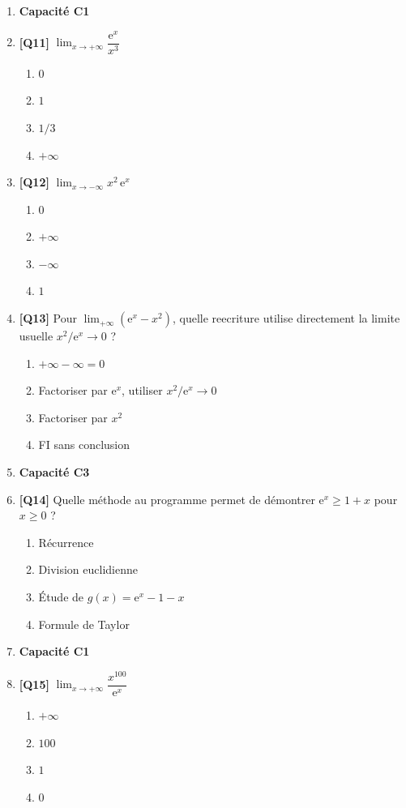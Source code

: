 \begin{enumerate}
\item[] \textbf{Capacité C1}

\item \textbf{[Q11]} $\lim_{x \to +\infty} \dfrac{\mathrm{e}^x}{x^3}$
  \begin{enumerate}[label=\Alph*.]
    \item $0$
    \item $1$
    \item $1/3$
    \item $+\infty$
  \end{enumerate}

\item \textbf{[Q12]} $\lim_{x \to -\infty} x^2\,\mathrm{e}^x$
  \begin{enumerate}[label=\Alph*.]
    \item $0$
    \item $+\infty$
    \item $-\infty$
    \item $1$
  \end{enumerate}

\item \textbf{[Q13]} Pour $\lim_{+\infty}(\mathrm{e}^x - x^2)$, quelle reecriture utilise directement la limite usuelle $x^2/\mathrm{e}^x \to 0$ ?
  \begin{enumerate}[label=\Alph*.]
    \item $+\infty - \infty = 0$
    \item Factoriser par $\mathrm{e}^x$, utiliser $x^2/\mathrm{e}^x \to 0$
    \item Factoriser par $x^2$
    \item FI sans conclusion
  \end{enumerate}

\item[] \textbf{Capacité C3}

\item \textbf{[Q14]} Quelle méthode au programme permet de démontrer $\mathrm{e}^x \geq 1 + x$ pour $x \geq 0$ ?
  \begin{enumerate}[label=\Alph*.]
    \item Récurrence
    \item Division euclidienne
    \item Étude de $g(x) = \mathrm{e}^x - 1 - x$
    \item Formule de Taylor
  \end{enumerate}

\item[] \textbf{Capacité C1}

\item \textbf{[Q15]} $\lim_{x \to +\infty} \dfrac{x^{100}}{\mathrm{e}^x}$
  \begin{enumerate}[label=\Alph*.]
    \item $+\infty$
    \item $100$
    \item $1$
    \item $0$
  \end{enumerate}

\end{enumerate}

